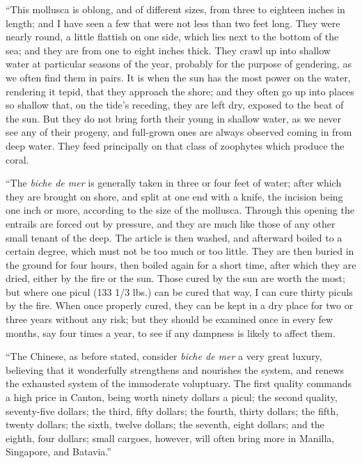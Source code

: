 ``This mollusca is oblong, and of different sizes, from three to eighteen
inches in length; and I have seen a few that were not less than two feet long.
They were nearly round, a little flattish on one side, which lies next to the
bottom of the sea; and they are from one to eight inches thick. They crawl up
into shallow water at particular seasons of the year, probably for the purpose
of gendering, as we often find them in pairs. It is when the sun has the most
power on the water, rendering it tepid, that they approach the shore; and they
often go up into places so shallow that, on the tide's receding, they are left
dry, exposed to the beat of the sun. But they do not bring forth their young in
shallow water, as we never see any of their progeny, and full-grown ones are
always observed coming in from deep water. They feed principally on that class
of zoophytes which produce the coral. 

``The \emph{biche de mer} is generally taken in three or four feet of water;
after which they are brought on shore, and split at one end with a knife, the
incision being one inch or more, according to the size of the mollusca. Through
this opening the entrails are forced out by pressure, and they are much like
those of any other small tenant of the deep. The article is then washed, and
afterward boiled to a certain degree, which must not be too much or too little.
They are then buried in the ground for four hours, then boiled again for a short
time, after which they are dried, either by the fire or the sun. Those cured by
the sun are worth the most; but where one picul (133 1/3 lbs.) can be cured that
way, I can cure thirty piculs by the fire. When once properly cured, they can be
kept in a dry place for two or three years without any risk; but they should be
examined once in every few months, say four times a year, to see if any dampness
is likely to affect them. 

``The Chinese, as before stated, consider \emph{biche de mer} a very great
luxury, believing that it wonderfully strengthens and nourishes the system, and
renews the exhausted system of the immoderate voluptuary. The first quality
commands a high price in Canton, being worth ninety dollars a picul; the second
quality, seventy-five dollars; the third, fifty dollars; the fourth, thirty
dollars; the fifth, twenty dollars; the sixth, twelve dollars; the seventh,
eight dollars; and the eighth, four dollars; small cargoes, however, will often
bring more in Manilla, Singapore, and Batavia.'' 

